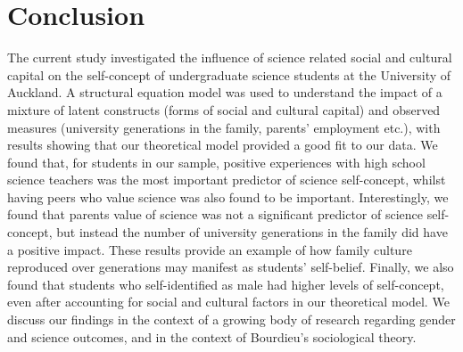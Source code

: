 \section*{Conclusion}
The current study investigated the influence of science related social and cultural capital on the self-concept of undergraduate science students at the University of Auckland. A structural equation model was used to understand the impact of a mixture of latent constructs (forms of social and cultural capital) and observed measures (university generations in the family, parents' employment etc.), with results showing that our theoretical model provided a good fit to our data. We found that, for students in our sample, positive experiences with high school science teachers was the most important predictor of science self-concept, whilst having peers who value science was also found to be important. Interestingly, we found that parents value of science was not a significant predictor of science self-concept, but instead the number of university generations in the family did have a positive impact. These results provide an example of how family culture reproduced over generations may manifest as students' self-belief. Finally, we also found that students who self-identified as male had higher levels of self-concept, even after accounting for social and cultural factors in our theoretical model. We discuss our findings in the context of a growing body of research regarding gender and science outcomes, and in the context of Bourdieu's sociological theory.  





